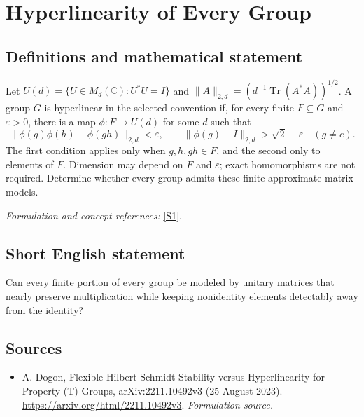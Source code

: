 \documentclass[11pt]{article}
\begin{document}
\section*{\texorpdfstring{Hyperlinearity of Every Group}{Hyperlinearity of Every Group}}\label{154}
\subsection{Definitions and mathematical statement}
Let $U(d)=\{U\in M_d({\mathbb{C}}):U^*U=I\}$ and
$\|A\|_{2,d}=(d^{-1}\operatorname{Tr}(A^*A))^{1/2}$. A group $G$ is hyperlinear in the selected convention if, for every finite $F\subseteq G$ and ${\varepsilon}>0$, there is a map $\phi:F\to U(d)$ for some $d$ such that
\[
 \|\phi(g)\phi(h)-\phi(gh)\|_{2,d}<{\varepsilon},
 \qquad \|\phi(g)-I\|_{2,d}>\sqrt2-{\varepsilon}\quad(g\ne e).
\]
The first condition applies only when $g,h,gh\in F$, and the second only to elements of $F$. Dimension may depend on $F$ and ${\varepsilon}$; exact homomorphisms are not required. Determine whether every group admits these finite approximate matrix models.
\par\smallskip\textit{Formulation and concept references:} \href{https://arxiv.org/html/2211.10492v3}{[S1]}.

\subsection{Short English statement}
Can every finite portion of every group be modeled by unitary matrices that nearly preserve multiplication while keeping nonidentity elements detectably away from the identity?
\subsection{Sources}
\begin{itemize}
\item[S1]A. Dogon, Flexible Hilbert-Schmidt Stability versus Hyperlinearity for Property (T) Groups, arXiv:2211.10492v3 (25 August 2023).
\url{https://arxiv.org/html/2211.10492v3}.
\textit{Formulation source.}
\end{itemize}
\end{document}
